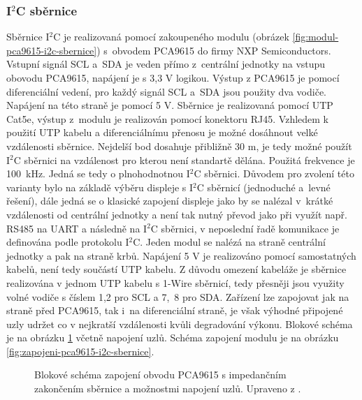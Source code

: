\subsubsection{I$^2$C sběrnice}
\label{ses:i2c-sbernice}
Sběrnice I$^2$C je realizovaná pomocí zakoupeného modulu (obrázek \ref{fig:modul-pca9615-i2c-sbernice}) s~obvodem PCA9615 do firmy  NXP Semiconductors. Vstupní signál SCL a~SDA je veden přímo z~centrální jednotky na vstupu obovodu PCA9615, napájení je s 3,3 V logikou. Výstup z PCA9615 je pomocí diferenciální vedení, pro každý signál SCL a~SDA jsou použity dva vodiče. Napájení na této straně je pomocí 5 V. Sběrnice je realizovaná pomocí UTP Cat5e, výstup z~modulu je realizován pomocí konektoru RJ45. Vzhledem k použití UTP kabelu a diferenciálnímu přenosu je možné dosáhnout velké vzdálenosti sběrnice. Nejdelší bod dosahuje přibližně 30 m, je tedy možné použít I$^2$C sběrnici na vzdálenost pro kterou není standartě dělána. Použitá frekvence je 100~kHz. Jedná se tedy o plnohodnotnou I$^2$C sběrnici. Důvodem pro zvolení této varianty bylo na základě výběru displeje s I$^2$C sběrnicí (jednoduché a~levné řešení), dále jedná se o klasické zapojení displeje jako by se nalézal v~krátké vzdálenosti od centrální jednotky a není tak nutný převod jako při využít např. RS485 na UART a následně na I$^2$C sběrnici, v neposlední řadě komunikace je definována podle protokolu I$^2$C.  Jeden modul se nalézá na straně centrální jednotky a pak na straně krbů. Napájení 5 V je realizováno pomocí samostatných kabelů, není tedy součástí UTP kabelu. Z důvodu omezení kabeláže je sběrnice realizována v jednom UTP kabelu s 1-Wire sběrnicí, tedy přesněji jsou využity volné vodiče s číslem 1,2 pro SCL a 7,~8 pro SDA. Zařízení lze zapojovat jak na straně před PCA9615, tak i~na diferenciální straně, je však výhodné připojené uzly udržet co v nejkratší vzdálenosti kvůli degradování výkonu. Blokové schéma je na obrázku \ref{fig:blokove-schema-pca9615-i2c-sbernice} včetně napojení uzlů. Schéma zapojení modulu je na obrázku \ref{fig:zapojeni-pca9615-i2c-sbernice}.

\begin{figure}[H]
    \centering
    \def\svgwidth{\columnwidth}
    
    \caption{Blokové schéma zapojení obvodu PCA9615 s impedančním zakončením sběrnice a možnostmi napojení uzlů. Upraveno z \cite{pca9615-schema-zapojeni}.}
    \label{fig:blokove-schema-pca9615-i2c-sbernice}
\end{figure}

